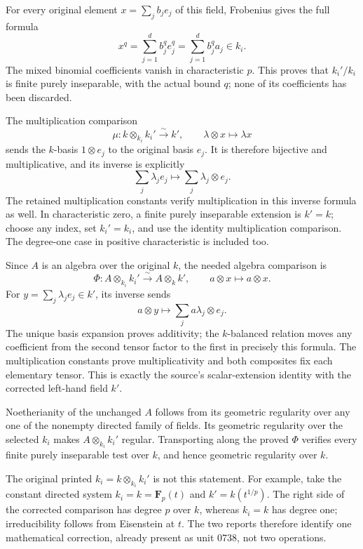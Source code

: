For every original element \(x=\sum_jb_je_j\) of this field, Frobenius gives the full formula \[
 x^q=\sum_{j=1}^d b_j^q e_j^q=\sum_{j=1}^d b_j^q a_j\in k_i.
\] The mixed binomial coefficients vanish in characteristic \(p\). This proves that \(k_i'/k_i\) is finite purely inseparable, with the actual bound \(q\); none of its coefficients has been discarded.

The multiplication comparison \[
 \mu:k\otimes_{k_i}k_i'\xrightarrow{\sim}k',\qquad
 \lambda\otimes x\longmapsto\lambda x
\] sends the \(k\)-basis \(1\otimes e_j\) to the original basis \(e_j\). It is therefore bijective and multiplicative, and its inverse is explicitly \[
 \sum_j\lambda_je_j\longmapsto\sum_j\lambda_j\otimes e_j.
\] The retained multiplication constants verify multiplication in this inverse formula as well. In characteristic zero, a finite purely inseparable extension is \(k'=k\); choose any index, set \(k_i'=k_i\), and use the identity multiplication comparison. The degree-one case in positive characteristic is included too.

Since \(A\) is an algebra over the original \(k\), the needed algebra comparison is \[
 \Phi:A\otimes_{k_i}k_i'\xrightarrow{\sim}A\otimes_kk',
 \qquad a\otimes x\longmapsto a\otimes x.
\] For \(y=\sum_j\lambda_je_j\in k'\), its inverse sends \[
 a\otimes y\longmapsto\sum_j a\lambda_j\otimes e_j.
\] The unique basis expansion proves additivity; the \(k\)-balanced relation moves any coefficient from the second tensor factor to the first in precisely this formula. The multiplication constants prove multiplicativity and both composites fix each elementary tensor. This is exactly the source's scalar-extension identity with the corrected left-hand field \(k'\).

Noetherianity of the unchanged \(A\) follows from its geometric regularity over any one of the nonempty directed family of fields. Its geometric regularity over the selected \(k_i\) makes \(A\otimes_{k_i}k_i'\) regular. Transporting along the proved \(\Phi\) verifies every finite purely inseparable test over \(k\), and hence geometric regularity over \(k\).

The original printed \(k_i=k\otimes_{k_i}k_i'\) is not this statement. For example, take the constant directed system \(k_i=k=\mathbf F_p(t)\) and \(k'=k(t^{1/p})\). The right side of the corrected comparison has degree \(p\) over \(k\), whereas \(k_i=k\) has degree one; irreducibility follows from Eisenstein at \(t\). The two reports therefore identify one mathematical correction, already present as unit 0738, not two operations.

